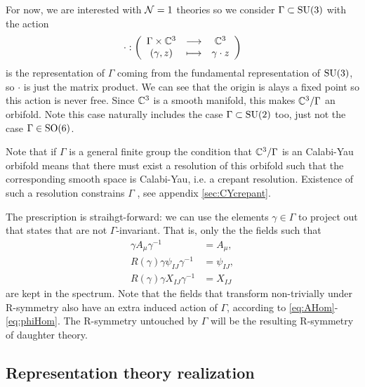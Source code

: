 \documentclass[a4paper,11pt]{article}
\begin{document}
        For now, we are interested with $\mathcal{N}=1$ theories so we consider $\Gamma\subset\text{SU}(3)$ with the action
        \begin{equation}
            \cdot:\left(
            \begin{array}{ccc}
                \Gamma\times\mathbb{C}^3 & \longrightarrow & \mathbb{C}^3 \\
                (\gamma,z) & \longmapsto & \gamma\cdot z
            \end{array}
            \right)
        \end{equation}
        is the representation of $\Gamma$ coming from the fundamental representation of $\text{SU}(3)$, so $\cdot$ is just the matrix product. We can see that the origin is alays a fixed point so this action is never free. Since $\mathbb{C}^3$ is a smooth manifold, this makes $\mathbb{C}^3/\Gamma$ an orbifold. Note this case naturally includes the case $\Gamma\subset\text{SU}(2)$ too, just not the case $\Gamma\in\text{SO}(6)$.

        Note that if $\Gamma$ is a general finite group the condition that $\mathbb{C}^3/\Gamma$ is an Calabi-Yau orbifold means that there must exist a resolution of this orbifold such that the corresponding smooth space is Calabi-Yau, i.e. a crepant resolution. Existence of such a resolution constrains $\Gamma$ \marker, see appendix \ref{sec:CYcrepant}.

        The prescription is straihgt-forward: we can use the elements $\gamma\in\Gamma$ to project out that states that are not $\Gamma$-invariant. That is, only the the fields such that
        \begin{align}
            \gamma A_\mu \gamma^{-1} &= A_\mu,\label{eq:proj1}\\
            R(\gamma)\gamma \psi_{IJ} \gamma^{-1} &= \psi_{IJ}\label{eq:proj2},\\
            R(\gamma)\gamma X_{IJ} \gamma^{-1} &= X_{IJ}\label{eq:proj3}
        \end{align}
        are kept in the spectrum. Note that the fields that transform non-trivially under R-symmetry also have an extra induced action of $\Gamma$, according to \eqref{eq:AHom}-\eqref{eq:phiHom}. The R-symmetry untouched by $\Gamma$ will be the resulting R-symmetry of daughter theory.

    \subsection{Representation theory realization}
\end{document}
